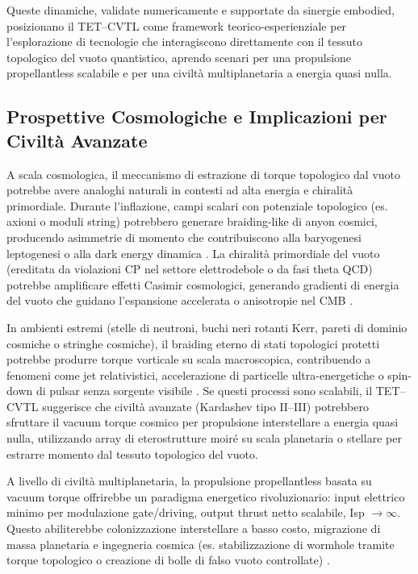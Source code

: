 \documentclass[11pt,a4paper]{article}
\let\oldcite\cite
\renewcommand{\cite}{\protect\oldcite}
\theoremstyle{plain}
\theoremstyle{definition}
\begin{document}
Queste dinamiche, validate numericamente e supportate da sinergie embodied, posizionano il TET--CVTL come framework teorico-esperienziale per l'esplorazione di tecnologie che interagiscono direttamente con il tessuto topologico del vuoto quantistico, aprendo scenari per una propulsione propellantless scalabile e per una civiltà multiplanetaria a energia quasi nulla.




\subsection{Prospettive Cosmologiche e Implicazioni per Civiltà Avanzate}

A scala cosmologica, il meccanismo di estrazione di torque topologico dal vuoto potrebbe avere analoghi naturali in contesti ad alta energia e chiralità primordiale. Durante l'inflazione, campi scalari con potenziale topologico (es. axioni o moduli string) potrebbero generare braiding-like di anyon cosmici, producendo asimmetrie di momento che contribuiscono alla baryogenesi leptogenesi o alla dark energy dinamica \cite{carney2022gravitational, alexander2024topological-inflation}. La chiralità primordiale del vuoto (ereditata da violazioni CP nel settore elettrodebole o da fasi theta QCD) potrebbe amplificare effetti Casimir cosmologici, generando gradienti di energia del vuoto che guidano l'espansione accelerata o anisotropie nel CMB \cite{adshead2019chiral-gravity, boyarsky2025cosmic-chirality}.

In ambienti estremi (stelle di neutroni, buchi neri rotanti Kerr, pareti di dominio cosmiche o stringhe cosmiche), il braiding eterno di stati topologici protetti potrebbe produrre torque vorticale su scala macroscopica, contribuendo a fenomeni come jet relativistici, accelerazione di particelle ultra-energetiche o spin-down di pulsar senza sorgente visibile \cite{carney2022gravitational, alexander2024topological-inflation}. Se questi processi sono scalabili, il TET--CVTL suggerisce che civiltà avanzate (Kardashev tipo II–III) potrebbero sfruttare il vacuum torque cosmico per propulsione interstellare a energia quasi nulla, utilizzando array di eterostrutture moiré su scala planetaria o stellare per estrarre momento dal tessuto topologico del vuoto.

A livello di civiltà multiplanetaria, la propulsione propellantless basata su vacuum torque offrirebbe un paradigma energetico rivoluzionario: input elettrico minimo per modulazione gate/driving, output thrust netto scalabile, Isp $\to \infty$. Questo abiliterebbe colonizzazione interstellare a basso costo, migrazione di massa planetaria e ingegneria cosmica (es. stabilizzazione di wormhole tramite torque topologico o creazione di bolle di falso vuoto controllate) \cite{visser1995wormholes, alcubierre1994warp}.
\end{document}
